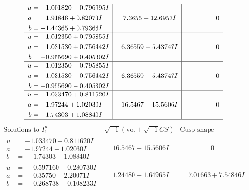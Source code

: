 \documentclass[1p]{elsarticle_modified}
\theoremstyle{definition}
\newcommand{\I}{\sqrt{-1}}
\begin{document}
$$\begin{array}{c|c|c}
\begin{aligned}
u &= -1.001820 - 0.796995 I \\
a &= \phantom{-}1.91846 + 0.82073 I \\
b &= -1.44365 + 0.79366 I\end{aligned}
 & \phantom{-}7.3655 - 12.6957 I & \phantom{-0.000000 } 0 \\ \hline\begin{aligned}
u &= \phantom{-}1.012350 + 0.795855 I \\
a &= \phantom{-}1.031530 + 0.756442 I \\
b &= -0.955690 + 0.405302 I\end{aligned}
 & \phantom{-}6.36559 - 5.43747 I & \phantom{-0.000000 } 0 \\ \hline\begin{aligned}
u &= \phantom{-}1.012350 - 0.795855 I \\
a &= \phantom{-}1.031530 - 0.756442 I \\
b &= -0.955690 - 0.405302 I\end{aligned}
 & \phantom{-}6.36559 + 5.43747 I & \phantom{-0.000000 } 0 \\ \hline\begin{aligned}
u &= -1.033470 + 0.811620 I \\
a &= -1.97244 + 1.02030 I \\
b &= \phantom{-}1.74303 + 1.08840 I\end{aligned}
 & \phantom{-}16.5467 + 15.5606 I & \phantom{-0.000000 } 0\\
 \hline 
 \end{array}$$\newpage$$\begin{array}{c|c|c}  
\text{Solutions to }I^u_{1}& \I (\text{vol} + \sqrt{-1}CS) & \text{Cusp shape}\\
 \hline 
\begin{aligned}
u &= -1.033470 - 0.811620 I \\
a &= -1.97244 - 1.02030 I \\
b &= \phantom{-}1.74303 - 1.08840 I\end{aligned}
 & \phantom{-}16.5467 - 15.5606 I & \phantom{-0.000000 } 0 \\ \hline\begin{aligned}
u &= \phantom{-}0.597160 + 0.280730 I \\
a &= \phantom{-}0.35750 - 2.20071 I \\
b &= \phantom{-}0.268738 + 0.108233 I\end{aligned}
 & \phantom{-}1.24480 - 1.64965 I & \phantom{-}7.01663 + 7.54846 I \\ \hline\begin{aligned}

\end{aligned}
\end{array}$$
\end{document}
